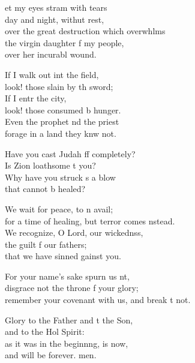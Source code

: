 \settowidth{\versewidth}{remember your covenant with us, and break it not.}
\begin{psalmverse}%
  \begin{patverse}
et my eyes stram with tears\Med\\
day and night, withut rest,\\
over the great destruction which overwhlms\Flex\\
the virgin daughter f my people,\Med\\
over her incurabl wound.

If I walk out int the field,\Med\\
look! those slain by th sword;\\
If I entr the city,\Med\\
look! those consumed b hunger.\\
Even the prophet nd the priest\Med\\
forage in a land they knw not.

Have you cast Judah ff completely?\Med\\
Is Zion loathsome t you?\\
Why have you struck s a blow\Med\\
that cannot b healed?

We wait for peace, to n avail;\Med\\
for a time of healing, but terror comes \pointup{\i}nstead.\\
We recognize, O Lord, our wickednss,\Flex\\
the guilt f our fathers;\Med\\
that we have sinned gainst you.

For your name’s sake spurn us nt,\Flex\\
disgrace not the throne f your glory;\Med\\
remember your covenant with us, and break \pointup{\i}t not.

Glory to the Father and t the Son,\Med\\
and to the Hol Spirit:\\
as it was in the beginnng, is now,\Med\\
and will be forever. men.
  \end{patverse}
\end{psalmverse}
